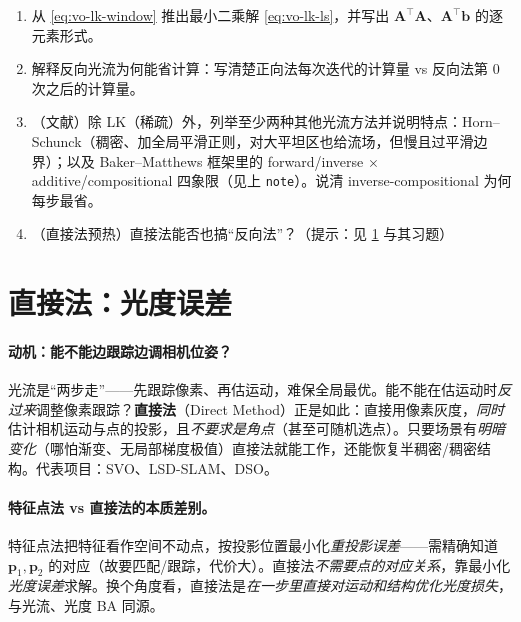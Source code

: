 \begin{practice}
\begin{enumerate}
  \item 从 \cref{eq:vo-lk-window} 推出最小二乘解 \cref{eq:vo-lk-ls}，并写出 $\mathbf{A}^\top\mathbf{A}$、$\mathbf{A}^\top\mathbf{b}$ 的逐元素形式。
  \item 解释反向光流为何能省计算：写清楚正向法每次迭代的计算量 vs 反向法第 $0$ 次之后的计算量。
  \item （文献）除 LK（稀疏）外，列举至少两种其他光流方法并说明特点：Horn--Schunck（稠密、加全局平滑正则，对大平坦区也给流场，但慢且过平滑边界）；以及 Baker--Matthews\cite{baker2004lk} 框架里的 forward/inverse $\times$ additive/compositional 四象限（见上 \texttt{note}）。说清 inverse-compositional 为何每步最省。
  \item （直接法预热）直接法能否也搞“反向法”？（提示：见 \cref{sec:vo-direct} 与其习题）
\end{enumerate}
\end{practice}

\section{直接法：光度误差}
\label{sec:vo-direct}

\paragraph{动机：能不能边跟踪边调相机位姿？}光流是“两步走”——先跟踪像素、再估运动，难保全局最优\cite{gaoxiang2019slam14}。能不能在估运动时\emph{反过来}调整像素跟踪？\textbf{直接法}（Direct Method）正是如此：直接用像素灰度，\emph{同时}估计相机运动与点的投影，且\emph{不要求是角点}（甚至可随机选点）。只要场景有\emph{明暗变化}（哪怕渐变、无局部梯度极值）直接法就能工作，还能恢复半稠密/稠密结构。代表项目：SVO、LSD-SLAM、DSO\cite{gaoxiang2019slam14,carlone2026handbook}。

\paragraph{特征点法 vs 直接法的本质差别\cite{gaoxiang2019slam14,carlone2026handbook}。}特征点法把特征看作空间不动点，按投影位置最小化\emph{重投影误差}——需精确知道 $\mathbf{p}_1,\mathbf{p}_2$ 的对应（故要匹配/跟踪，代价大）。直接法\emph{不需要点的对应关系}，靠最小化\emph{光度误差}求解。换个角度看，直接法是\emph{在一步里直接对运动和结构优化光度损失}，与光流、光度 BA 同源\cite{carlone2026handbook}。

